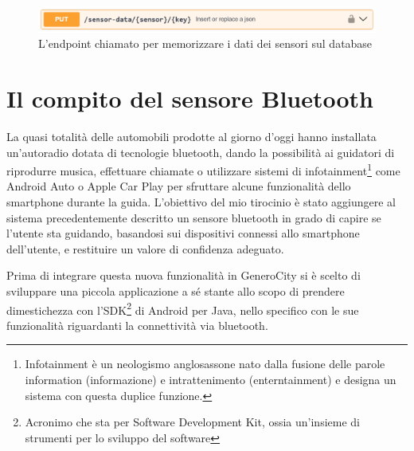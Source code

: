 \begin{figure}[h]
    \centering
    \includegraphics[width=1\linewidth]{images/endpoint.png}
    \caption{L'endpoint chiamato per memorizzare i dati dei sensori sul database}
    \label{fig:endpoint}
\end{figure}

\section{Il compito del sensore Bluetooth}
La quasi totalità delle automobili prodotte al giorno d'oggi hanno installata un'autoradio dotata di tecnologie bluetooth, dando la possibilità ai guidatori di riprodurre musica, effettuare chiamate o utilizzare sistemi di infotainment\footnote{Infotainment è un neologismo anglosassone nato dalla fusione delle parole information (informazione) e intrattenimento (enterntainment) e designa un sistema con questa duplice funzione.} come Android Auto o Apple Car Play per sfruttare alcune funzionalità dello smartphone durante la guida.\cite{ref:car-bluetooth} L'obiettivo del mio tirocinio è stato aggiungere al sistema precedentemente descritto un sensore bluetooth in grado di capire se l'utente sta guidando, basandosi sui dispositivi connessi allo smartphone dell'utente, e restituire un valore di confidenza adeguato.

Prima di integrare questa nuova funzionalità in GeneroCity si è scelto di sviluppare una piccola applicazione a sé stante allo scopo di prendere dimestichezza con l'SDK\footnote{Acronimo che sta per Software Development Kit, ossia un'insieme di strumenti per lo sviluppo del software} di Android per Java, nello specifico con le sue funzionalità riguardanti la connettività via bluetooth.
